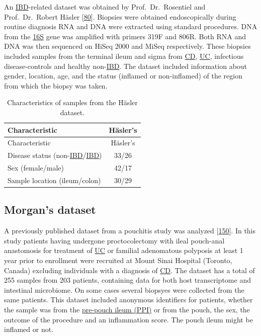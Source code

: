 \documentclass[
  12pt,
  a4paper,
  twoside,
  openright]{book}
\begin{document}
An \protect\hyperlink{acronyms_IBD}{IBD}-related dataset was obtained by Prof.~Dr.~Rosentiel and Prof.~Dr.~Robert Häsler {[}\protect\hyperlink{ref-hasler_uncoupling_2016}{80}{]}.
Biopsies were obtained endoscopically during routine diagnosis RNA and DNA were extracted using standard procedures.
DNA from the \protect\hyperlink{acronyms_16S}{16S} gene was amplified with primers 319F and 806R.
Both RNA and DNA was then sequenced on HiSeq 2000 and MiSeq respectively.
These biopsies included samples from the terminal ileum and sigma from \protect\hyperlink{acronyms_CD}{CD}, \protect\hyperlink{acronyms_UC}{UC}, infectious disease-controls and healthy non-\protect\hyperlink{acronyms_IBD}{IBD}.
The dataset included information about gender, location, age, and the status (inflamed or non-inflamed) of the region from which the biopsy was taken.

\begin{longtable}[]{@{}lc@{}}
\caption{\label{tab:Hasler} Characteristics of samples from the Häsler dataset.}\tabularnewline
\toprule
Characteristic & Häsler's \\
\midrule
\endfirsthead
\toprule
Characteristic & Häsler's \\
\midrule
\endhead
Disease status (non-\protect\hyperlink{acronyms_IBD}{IBD}/\protect\hyperlink{acronyms_IBD}{IBD}) & 33/26 \\
Sex (female/male) & 42/17 \\
Sample location (ileum/colon) & 30/29 \\
\bottomrule
\end{longtable}

\hypertarget{methods-morgan}{%
\subsection{Morgan's dataset}\label{methods-morgan}}

A previously published dataset from a pouchitis study was analyzed {[}\protect\hyperlink{ref-morgan2015}{150}{]}.
In this study patients having undergone proctocolectomy with ileal pouch-anal anastomosis for treatment of \protect\hyperlink{acronyms_UC}{UC} or familial adenomatous polyposis at least 1 year prior to enrollment were recruited at Mount Sinai Hospital (Toronto, Canada) excluding individuals with a diagnosis of \protect\hyperlink{acronyms_CD}{CD}.
The dataset has a total of 255 samples from 203 patients, containing data for both host transcriptome and intestinal microbiome.
On some cases several biopsyes were collected from the same patients.
This dataset included anonymous identifiers for patients, whether the sample was from the \protect\hyperlink{acronyms_PPI}{pre-pouch ileum (PPI)} or from the pouch, the sex, the outcome of the procedure and an inflammation score.
The pouch ileum might be inflamed or not.
\end{document}
